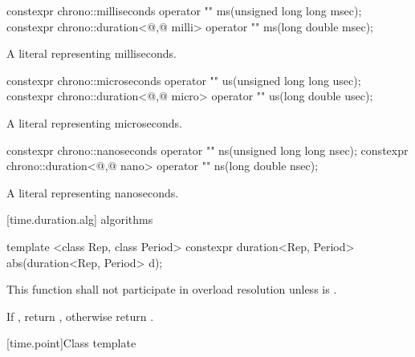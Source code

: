 \begin{itemdecl}
constexpr chrono::milliseconds                 operator "" ms(unsigned long long msec);
constexpr chrono::duration<@\unspec,@ milli> operator "" ms(long double msec);
\end{itemdecl}

\begin{itemdescr}
\pnum
\returns
A  literal representing  milliseconds.
\end{itemdescr}

\begin{itemdecl}
constexpr chrono::microseconds                 operator "" us(unsigned long long usec);
constexpr chrono::duration<@\unspec,@ micro> operator "" us(long double usec);
\end{itemdecl}

\begin{itemdescr}
\pnum
\returns
A  literal representing  microseconds.
\end{itemdescr}

\begin{itemdecl}
constexpr chrono::nanoseconds                 operator "" ns(unsigned long long nsec);
constexpr chrono::duration<@\unspec,@ nano> operator "" ns(long double nsec);
\end{itemdecl}

\begin{itemdescr}
\pnum
\returns
A  literal representing  nanoseconds.
\end{itemdescr}

[time.duration.alg]{ algorithms}

%
%
\begin{itemdecl}
template <class Rep, class Period>
  constexpr duration<Rep, Period> abs(duration<Rep, Period> d);
\end{itemdecl}

\begin{itemdescr}
\pnum
\remarks This function shall not participate in overload resolution
unless  is .

\pnum
\returns If , return ,
otherwise return .
\end{itemdescr}

[time.point]{Class template }

